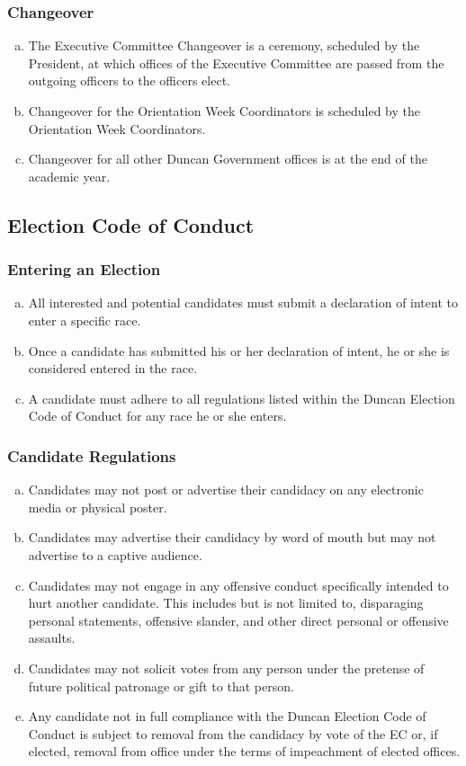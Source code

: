 \documentclass[USletter,12pt]{article}
\begin{document}
\begin{enumerate}[(a)]
\subsubsection{Changeover}
\begin{enumerate}[(a)]
\item The Executive Committee Changeover is a ceremony, scheduled by the President, at which offices of the Executive Committee are passed from the outgoing officers to the officers elect.
\item Changeover for the Orientation Week Coordinators is scheduled by the Orientation Week Coordinators.
\item Changeover for all other Duncan Government offices is at the end of the academic year.
\end{enumerate}


\subsection{Election Code of Conduct}


\subsubsection{Entering an Election}
\begin{enumerate}[(a)]
\item All interested and potential candidates must submit a declaration of intent to enter a specific race.
\item Once a candidate has submitted his or her declaration of intent, he or she is considered entered in the race.
\item A candidate must adhere to all regulations listed within the Duncan Election Code of Conduct for any race he or she enters.
\end{enumerate}

\subsubsection{Candidate Regulations}
\begin{enumerate}[(a)]
\item Candidates may not post or advertise their candidacy on any electronic media or physical poster.
\item Candidates may advertise their candidacy by word of mouth but may not advertise to a captive audience.
\item Candidates may not engage in any offensive conduct specifically intended to hurt another candidate.  This includes but is not limited to, disparaging personal statements, offensive slander, and other direct personal or offensive assaults.
\item Candidates may not solicit votes from any person under the pretense of future political patronage or gift to that person.
\item Any candidate not in full compliance with the Duncan Election Code of Conduct is subject to removal from the candidacy by vote of the EC or, if elected, removal from office under the terms of impeachment of elected offices.
\end{enumerate}


\end{enumerate}
\end{document}
